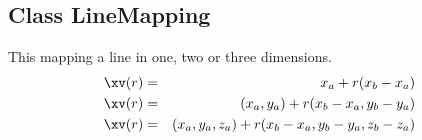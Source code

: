 \subsection{Class LineMapping}

 This mapping a line in one, two or three dimensions.
\begin{eqnarray*}
    \xv(r) &=& x_a + r(x_b-x_a)  \\
    \xv(r) &=& (x_a,y_a) + r(x_b-x_a,y_b-y_a)   \\
    \xv(r) &=& (x_a,y_a,z_a) + r(x_b-x_a,y_b-y_a,z_b-z_a)
\end{eqnarray*}

